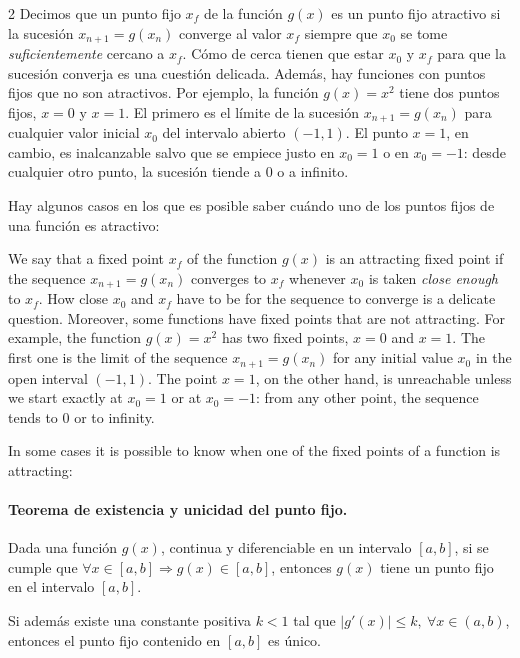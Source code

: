 \begin{paracol}{2}
Decimos que un punto fijo $x_f$ de la función $g(x)$ es un punto fijo atractivo si la sucesión $x_{n+1}=g(x_n)$ converge al valor $x_f$ siempre que $x_0$ se tome \emph{suficientemente} cercano a $x_f$. Cómo de cerca tienen que estar $x_0$ y $x_f$ para que la sucesión converja es una cuestión delicada. Además, hay funciones con puntos fijos que no son atractivos. Por ejemplo, la función $g(x)=x^2$ tiene dos puntos fijos, $x=0$ y $x=1$. El primero es el límite de la sucesión $x_{n+1}=g(x_n)$ para cualquier valor inicial $x_0$ del intervalo abierto $(-1,  1)$. El punto $x=1$, en cambio, es inalcanzable salvo que se empiece justo en $x_0=1$ o en $x_0=-1$: desde cualquier otro punto, la sucesión tiende a 0 o a infinito.

Hay algunos casos en los que es posible saber cuándo uno de los puntos fijos de una función es atractivo:
\switchcolumn

We say that a fixed point $x_f$ of the function $g(x)$ is an attracting fixed point if the sequence $x_{n+1}=g(x_n)$ converges to $x_f$ whenever $x_0$ is taken \emph{close enough} to $x_f$. How close $x_0$ and $x_f$ have to be for the sequence to converge is a delicate question. Moreover, some functions have fixed points that are not attracting. For example, the function $g(x)=x^2$ has two fixed points, $x=0$ and $x=1$. The first one is the limit of the sequence $x_{n+1}=g(x_n)$ for any initial value $x_0$ in the open interval $(-1, 1)$. The point $x=1$, on the other hand, is unreachable unless we start exactly at $x_0=1$ or at $x_0=-1$: from any other point, the sequence tends to 0 or to infinity.

In some cases it is possible to know when one of the fixed points of a function is attracting:

\switchcolumn

\paragraph{Teorema de existencia y unicidad del punto fijo.} Dada una función $g(x)$, continua y diferen\-ciable en un intervalo $[a, b]$, si se cumple que $\forall x \in [a, b] \Rightarrow g(x)\in [a,b]$, entonces $g(x)$ tiene un punto fijo en el intervalo $[a, b]$.

Si además existe una constante positiva $k < 1$ tal que $\vert g'(x) \vert \leq k, \  \forall x \in (a, b)$, entonces el punto fijo contenido en $[a,b]$ es único.


\end{paracol}
